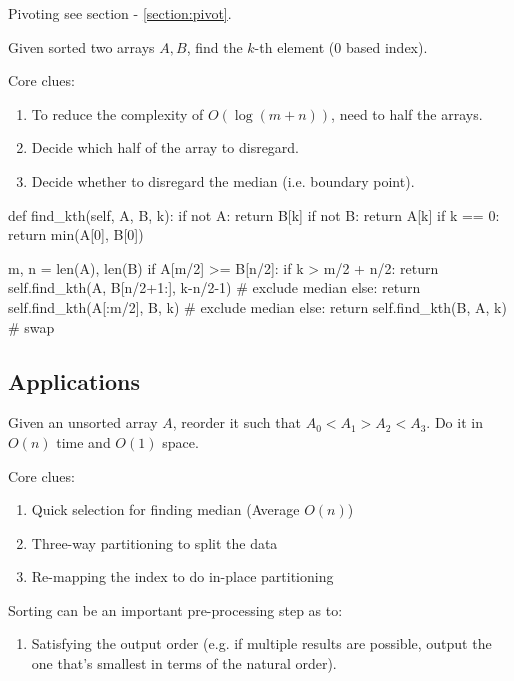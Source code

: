 Pivoting see section - \ref{section:pivot}.

 Given sorted two arrays $A, B$, find the $k$-th element (0 based index).

Core clues:
\begin{enumerate}
\item To reduce the complexity of $O(\log (m+n))$, need to half the arrays.
\item Decide which half of the array to disregard. 
\item Decide whether to disregard the median (i.e. boundary point).
\end{enumerate}
\begin{python}
def find_kth(self, A, B, k):
  if not A:  return B[k]
  if not B:  return A[k]
  if k == 0: return min(A[0], B[0])

  m, n = len(A), len(B)
  if A[m/2] >= B[n/2]:
    if k > m/2 + n/2:
      return self.find_kth(A, B[n/2+1:], k-n/2-1)  # exclude median
    else:
      return self.find_kth(A[:m/2], B, k)  # exclude median
  else:
    return self.find_kth(B, A, k)  # swap
\end{python}
\subsection{Applications}
 Given an unsorted array $A$, reorder it such that $A_0 < A_1 > A_2 < A_3$. Do it in $O(n)$ time and $O(1)$ space. 

Core clues:
\begin{enumerate}
\item Quick selection for finding median (Average $O(n)$)
\item Three-way partitioning to split the data
\item Re-mapping the index to do in-place partitioning
\end{enumerate}

 Sorting can be an important pre-processing step as to:
\begin{enumerate}
\item Satisfying the output order (e.g. if multiple results are possible, output the one that's smallest in terms of the natural order). 
\end{enumerate}

